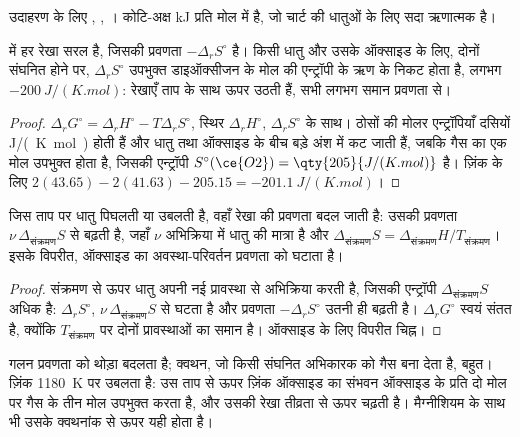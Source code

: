 उदाहरण के लिए , , । कोटि-अक्ष \unit{kJ} प्रति मोल  में है, जो चार्ट की
धातुओं के लिए सदा ऋणात्मक है।

\begin{proposition}[सरल रेखाएँ]\label{prop:b2:ellingham:line}
 में हर रेखा सरल है, जिसकी प्रवणता $-\Delta_r
S^\circ$ है। किसी धातु और उसके ऑक्साइड के लिए, दोनों संघनित होने पर, $\Delta_r S^\circ$
उपभुक्त डाइऑक्सीजन के मोल की एन्ट्रॉपी के ऋण के निकट होता है, लगभग
$-\qty{200}{J/(K.mol)}$: रेखाएँ ताप के साथ ऊपर उठती हैं, सभी लगभग
समान प्रवणता से।
\end{proposition}

\begin{proof}
$\Delta_r G^\circ = \Delta_r H^\circ - T\Delta_r S^\circ$, स्थिर $\Delta_r
H^\circ$, $\Delta_r S^\circ$ के साथ। ठोसों की मोलर एन्ट्रॉपियाँ दसियों
\unit{J/(K.mol)} होती हैं और धातु तथा ऑक्साइड के बीच बड़े अंश में कट जाती हैं, जबकि
गैस का एक मोल उपभुक्त होता है, जिसकी एन्ट्रॉपी $S^\circ(\ce{O2}) = \qty{205}{J/(K.mol)}$ है। ज़िंक के लिए
$2(43.65) - 2(41.63) - 205.15 = \qty{-201.1}{J/(K.mol)}$।
\end{proof}

\begin{proposition}[रेखाओं में मोड़]\label{prop:b2:ellingham:break}
जिस ताप पर धातु पिघलती या उबलती है, वहाँ रेखा की प्रवणता बदल जाती है:
उसकी प्रवणता $\nu\,\Delta_{\text{संक्रमण}}S$ से बढ़ती है, जहाँ $\nu$ अभिक्रिया में
धातु की मात्रा है और $\Delta_{\text{संक्रमण}}S = \Delta_{\text{संक्रमण}}H/T_{\text{संक्रमण}}$।
इसके विपरीत, ऑक्साइड का अवस्था-परिवर्तन प्रवणता को घटाता है।
\end{proposition}

\begin{proof}
संक्रमण से ऊपर धातु अपनी नई प्रावस्था से अभिक्रिया करती है, जिसकी एन्ट्रॉपी
$\Delta_{\text{संक्रमण}}S$ अधिक है: $\Delta_r S^\circ$, $\nu\,\Delta_{\text{संक्रमण}}S$ से घटता है
और प्रवणता $-\Delta_r S^\circ$ उतनी ही बढ़ती है। $\Delta_r G^\circ$
स्वयं संतत है, क्योंकि $T_{\text{संक्रमण}}$ पर दोनों प्रावस्थाओं का
 समान है। ऑक्साइड के लिए विपरीत चिह्न।
\end{proof}

गलन प्रवणता को थोड़ा बदलता है; क्वथन, जो किसी संघनित अभिकारक को
गैस बना देता है, बहुत। ज़िंक \qty{1180}{K} पर उबलता है: उस ताप से ऊपर
ज़िंक ऑक्साइड का संभवन ऑक्साइड के प्रति दो मोल पर गैस के तीन मोल उपभुक्त करता है,
और उसकी रेखा तीव्रता से ऊपर चढ़ती है। मैग्नीशियम के साथ भी उसके क्वथनांक से
ऊपर यही होता है।

